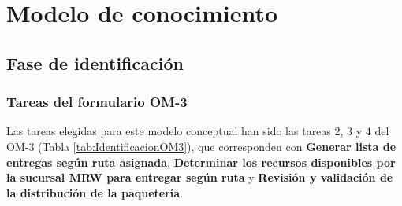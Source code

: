 

\chapter{Modelo de conocimiento}
\newpage
\section{Fase de identificación}
\subsection{Tareas del formulario OM-3}
Las tareas elegidas para este modelo conceptual han sido las tareas 2, 3 y 4 del OM-3 (Tabla \ref{tab:IdentificacionOM3}), que corresponden con \textbf{Generar lista de entregas según ruta asignada}, \textbf{Determinar los recursos disponibles por la sucursal MRW para entregar según ruta} y \textbf{Revisión y validación de la distribución de la paquetería}.

